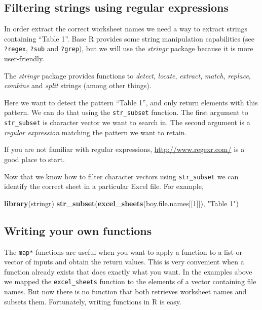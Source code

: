 \documentclass[]{book}
\newenvironment{Shaded}{\begin{snugshade}}{\end{snugshade}}
\newcommand{\KeywordTok}[1]{\textcolor[rgb]{0.13,0.29,0.53}{\textbf{#1}}}
\newcommand{\DecValTok}[1]{\textcolor[rgb]{0.00,0.00,0.81}{#1}}
\newcommand{\StringTok}[1]{\textcolor[rgb]{0.31,0.60,0.02}{#1}}
\newcommand{\NormalTok}[1]{#1}
\begin{document}
\subsection{Filtering strings using regular
expressions}\label{filtering-strings-using-regular-expressions}

In order extract the correct worksheet names we need a way to extract
strings containing ``Table 1''. Base R provides some string manipulation
capabilities (see \texttt{?regex}, \texttt{?sub} and \texttt{?grep}),
but we will use the \emph{stringr} package because it is more
user-friendly.

The \emph{stringr} package provides functions to \emph{detect},
\emph{locate}, \emph{extract}, \emph{match}, \emph{replace},
\emph{combine} and \emph{split} strings (among other things).

Here we want to detect the pattern ``Table 1'', and only return elements
with this pattern. We can do that using the \texttt{str\_subset}
function. The first argument to \texttt{str\_subset} is character vector
we want to search in. The second argument is a \emph{regular expression}
matching the pattern we want to retain.

If you are not familiar with regular expressions,
\url{http://www.regexr.com/} is a good place to start.

Now that we know how to filter character vectors using
\texttt{str\_subset} we can identify the correct sheet in a particular
Excel file. For example,

\begin{Shaded}
\begin{Highlighting}[]
\KeywordTok{library}\NormalTok{(stringr)}
\KeywordTok{str_subset}\NormalTok{(}\KeywordTok{excel_sheets}\NormalTok{(boy.file.names[[}\DecValTok{1}\NormalTok{]]), }\StringTok{"Table 1"}\NormalTok{)}
\end{Highlighting}
\end{Shaded}

\subsection{Writing your own
functions}\label{writing-your-own-functions}

The \texttt{map*} functions are useful when you want to apply a function
to a list or vector of inputs and obtain the return values. This is very
convenient when a function already exists that does exactly what you
want. In the examples above we mapped the \texttt{excel\_sheets}
function to the elements of a vector containing file names. But now
there is no function that both retrieves worksheet names and subsets
them. Fortunately, writing functions in R is easy.
\end{document}
